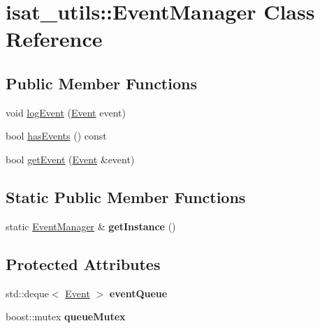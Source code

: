 \hypertarget{classisat__utils_1_1_event_manager}{}\section{isat\+\_\+utils\+:\+:Event\+Manager Class Reference}
\label{classisat__utils_1_1_event_manager}
\subsection*{Public Member Functions}
\begin{DoxyCompactItemize}
\item 
void \hyperlink{classisat__utils_1_1_event_manager_a8ae01f4eeb365b1ead6e81d38ae78195}{log\+Event} (\hyperlink{classisat__utils_1_1_event}{Event} event)
\item 
bool \hyperlink{classisat__utils_1_1_event_manager_ab95b464d5fdde2902c144c0445fbda75}{has\+Events} () const 
\item 
bool \hyperlink{classisat__utils_1_1_event_manager_acfb496b37edf922713c7a372dfacd80e}{get\+Event} (\hyperlink{classisat__utils_1_1_event}{Event} \&event)
\end{DoxyCompactItemize}
\subsection*{Static Public Member Functions}
\begin{DoxyCompactItemize}
\item 
static \hyperlink{classisat__utils_1_1_event_manager}{Event\+Manager} \& {\bfseries get\+Instance} ()\hypertarget{classisat__utils_1_1_event_manager_ab4cb6141ba60fb9fb4fbdfdb083c4a1b}{}\label{classisat__utils_1_1_event_manager_ab4cb6141ba60fb9fb4fbdfdb083c4a1b}

\end{DoxyCompactItemize}
\subsection*{Protected Attributes}
\begin{DoxyCompactItemize}
\item 
std\+::deque$<$ \hyperlink{classisat__utils_1_1_event}{Event} $>$ {\bfseries event\+Queue}\hypertarget{classisat__utils_1_1_event_manager_ab32d83c25318106a3dd2c2e4488f1789}{}\label{classisat__utils_1_1_event_manager_ab32d83c25318106a3dd2c2e4488f1789}

\item 
boost\+::mutex {\bfseries queue\+Mutex}\hypertarget{classisat__utils_1_1_event_manager_a36a612e1e1af43922b18d9efacad5853}{}\label{classisat__utils_1_1_event_manager_a36a612e1e1af43922b18d9efacad5853}

\end{DoxyCompactItemize}


